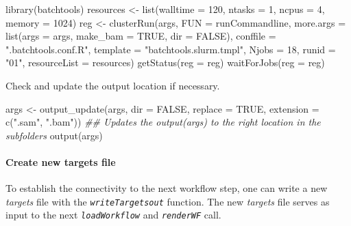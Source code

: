 \documentclass[14pt,]{article}
\newcommand{\hlnum}[1]{\textcolor[rgb]{0.816,0.125,0.439}{#1}}%
\newcommand{\hlstr}[1]{\textcolor[rgb]{0.251,0.627,0.251}{#1}}%
\newcommand{\hlcom}[1]{\textcolor[rgb]{0.502,0.502,0.502}{\textit{#1}}}%
\newcommand{\hlstd}[1]{\textcolor[rgb]{0.251,0.251,0.251}{#1}}%
\newenvironment{Shaded}{\begin{myshaded}}{\end{myshaded}}
\newcommand{\DecValTok}[1]{\hlnum{#1}}
\newcommand{\ConstantTok}[1]{\hlnum{#1}}
\newcommand{\StringTok}[1]{\hlstr{#1}}
\newcommand{\DocumentationTok}[1]{\hlcom{#1}}
\newcommand{\OtherTok}[1]{{#1}}
\newcommand{\FunctionTok}[1]{\hlstd{#1}}
\newcommand{\AttributeTok}[1]{{#1}}
\newcommand{\NormalTok}[1]{\hlstd{#1}}
\begin{document}
\begin{Shaded}
\begin{Highlighting}[]
\FunctionTok{library}\NormalTok{(batchtools)}
\NormalTok{resources }\OtherTok{\textless{}{-}} \FunctionTok{list}\NormalTok{(}\AttributeTok{walltime =} \DecValTok{120}\NormalTok{, }\AttributeTok{ntasks =} \DecValTok{1}\NormalTok{, }\AttributeTok{ncpus =} \DecValTok{4}\NormalTok{, }\AttributeTok{memory =} \DecValTok{1024}\NormalTok{)}
\NormalTok{reg }\OtherTok{\textless{}{-}} \FunctionTok{clusterRun}\NormalTok{(args, }\AttributeTok{FUN =}\NormalTok{ runCommandline, }\AttributeTok{more.args =} \FunctionTok{list}\NormalTok{(}\AttributeTok{args =}\NormalTok{ args, }\AttributeTok{make\_bam =} \ConstantTok{TRUE}\NormalTok{, }
    \AttributeTok{dir =} \ConstantTok{FALSE}\NormalTok{), }\AttributeTok{conffile =} \StringTok{".batchtools.conf.R"}\NormalTok{, }\AttributeTok{template =} \StringTok{"batchtools.slurm.tmpl"}\NormalTok{, }
    \AttributeTok{Njobs =} \DecValTok{18}\NormalTok{, }\AttributeTok{runid =} \StringTok{"01"}\NormalTok{, }\AttributeTok{resourceList =}\NormalTok{ resources)}
\FunctionTok{getStatus}\NormalTok{(}\AttributeTok{reg =}\NormalTok{ reg)}
\FunctionTok{waitForJobs}\NormalTok{(}\AttributeTok{reg =}\NormalTok{ reg)}
\end{Highlighting}
\end{Shaded}

Check and update the output location if necessary.

\begin{Shaded}
\begin{Highlighting}[]
\NormalTok{args }\OtherTok{\textless{}{-}} \FunctionTok{output\_update}\NormalTok{(args, }\AttributeTok{dir =} \ConstantTok{FALSE}\NormalTok{, }\AttributeTok{replace =} \ConstantTok{TRUE}\NormalTok{, }\AttributeTok{extension =} \FunctionTok{c}\NormalTok{(}\StringTok{".sam"}\NormalTok{, }\StringTok{".bam"}\NormalTok{))  }\DocumentationTok{\#\# Updates the output(args) to the right location in the subfolders}
\FunctionTok{output}\NormalTok{(args)}
\end{Highlighting}
\end{Shaded}

\hypertarget{create-new-targets-file}{%
\paragraph{Create new targets file}\label{create-new-targets-file}}

To establish the connectivity to the next workflow step, one can write a new
\emph{targets} file with the \emph{\texttt{writeTargetsout}} function. The new \emph{targets} file
serves as input to the next \emph{\texttt{loadWorkflow}} and \emph{\texttt{renderWF}} call.
\end{document}
